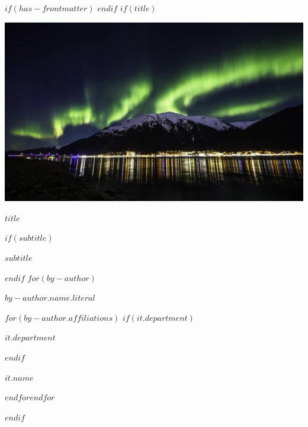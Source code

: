 
$if(has-frontmatter)$
\frontmatter
$endif$
$if(title)$
\cleardoublepage
\thispagestyle{empty}
{\centering
\vspace*{-3cm}
\vspace{2ex}
\par\noindent\includegraphics[width=\textwidth]{images/jnu_aurora.jpeg}
\\
\vspace{7ex}
{\huge\bfseries\color{uafblue} $title$ \par}
\vspace{3ex}
$if(subtitle)$
{\Large $subtitle$ \par}
$endif$
\vspace{15ex}
$for(by-author)$
{\Large $by-author.name.literal$ \par}
\vspace{3ex}
\vspace{12ex}
$for(by-author.affiliations)$%
$if(it.department)$%
{\bfseries\large $it.department$ \par}
\vspace{3ex}
$endif$%
{\bfseries\large $it.name$ \par}
$endfor$$endfor$%
}
$endif$

